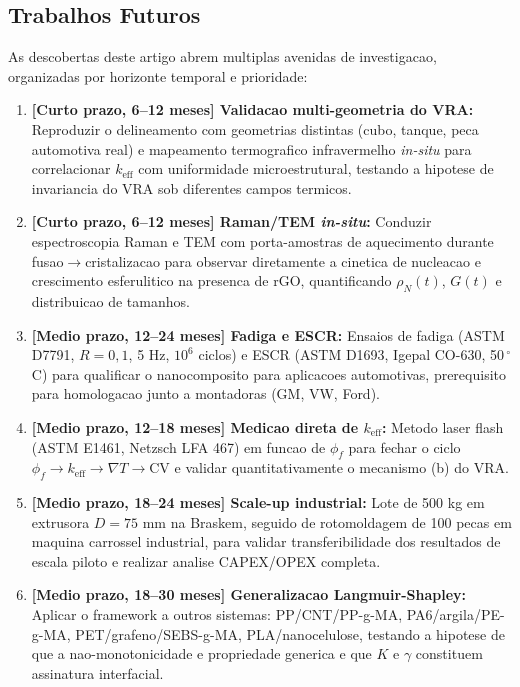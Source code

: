 \documentclass[11pt,a4paper,oneside]{article}
\begin{document}
\subsection{Trabalhos Futuros}\label{sec:trab_futuros}

As descobertas deste artigo abrem multiplas avenidas de investigacao, organizadas por horizonte temporal e prioridade:

\begin{enumerate}[label=(\alph*),nosep,leftmargin=*]
    \item {\bfseries [Curto prazo, 6--12 meses] Validacao multi-geometria do VRA:} Reproduzir o delineamento com geometrias distintas (cubo, tanque, peca automotiva real) e mapeamento termografico infravermelho \textit{in-situ} para correlacionar $k_{\text{eff}}$ com uniformidade microestrutural, testando a hipotese de invariancia do VRA sob diferentes campos termicos.
    \item {\bfseries [Curto prazo, 6--12 meses] Raman/TEM \textit{in-situ}:} Conduzir espectroscopia Raman e TEM com porta-amostras de aquecimento durante fusao$\rightarrow$cristalizacao para observar diretamente a cinetica de nucleacao e crescimento esferulitico na presenca de rGO, quantificando $\rho_N(t)$, $G(t)$ e distribuicao de tamanhos.
    \item {\bfseries [Medio prazo, 12--24 meses] Fadiga e ESCR:} Ensaios de fadiga (ASTM D7791, $R{=}0{,}1$, 5 Hz, $10^6$ ciclos) e ESCR (ASTM D1693, Igepal CO-630, 50$\,^{\circ}$C) para qualificar o nanocomposito para aplicacoes automotivas, prerequisito para homologacao junto a montadoras (GM, VW, Ford).
    \item {\bfseries [Medio prazo, 12--18 meses] Medicao direta de $k_{\text{eff}}$:} Metodo laser flash (ASTM E1461, Netzsch LFA 467) em funcao de $\phi_f$ para fechar o ciclo $\phi_f{\to}k_{\text{eff}}{\to}\nabla T{\to}$CV e validar quantitativamente o mecanismo (b) do VRA.
    \item {\bfseries [Medio prazo, 18--24 meses] Scale-up industrial:} Lote de 500 kg em extrusora $D{=}75$ mm na Braskem, seguido de rotomoldagem de 100 pecas em maquina carrossel industrial, para validar transferibilidade dos resultados de escala piloto e realizar analise CAPEX/OPEX completa.
    \item {\bfseries [Medio prazo, 18--30 meses] Generalizacao Langmuir-Shapley:} Aplicar o framework a outros sistemas: PP/CNT/PP-g-MA, PA6/argila/PE-g-MA, PET/grafeno/SEBS-g-MA, PLA/nanocelulose, testando a hipotese de que a nao-monotonicidade e propriedade generica e que $K$ e $\gamma$ constituem assinatura interfacial.

\end{enumerate}
\end{document}
